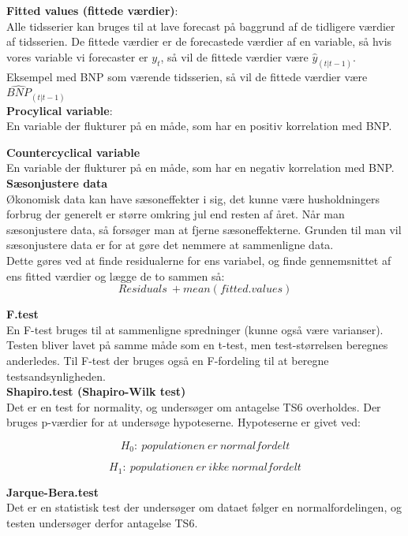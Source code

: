 \documentclass[
  10pt,
]{article}
\begin{document}
\textbf{Fitted values (fittede værdier)}:\\
Alle tidsserier kan bruges til at lave forecast på baggrund af de
tidligere værdier af tidsserien. De fittede værdier er de forecastede
værdier af en variable, så hvis vores variable vi forecaster er \(y_t\),
så vil de fittede værdier være \(\hat{{y}}_{(t|t-1)}\).\\
Eksempel med BNP som værende tidsserien, så vil de fittede værdier være
\(\hat{{BNP}}_{(t|t-1)}\)\\

\textbf{Procylical variable}:\\
En variable der flukturer på en måde, som har en positiv korrelation med
BNP.

\textbf{Countercyclical variable}\\
En variable der flukturer på en måde, som har en negativ korrelation med
BNP.\\

\textbf{Sæsonjustere data}\\
Økonomisk data kan have sæsoneffekter i sig, det kunne være
husholdningers forbrug der generelt er større omkring jul end resten af
året. Når man sæsonjustere data, så forsøger man at fjerne
sæsoneffekterne. Grunden til man vil sæsonjustere data er for at gøre
det nemmere at sammenligne data.\\
Dette gøres ved at finde residualerne for ens variabel, og finde
gennemsnittet af ens fitted værdier og lægge de to sammen så:
\[ Residuals \ + mean(fitted.values)  \]

\textbf{F.test}\\
En F-test bruges til at sammenligne spredninger (kunne også være
varianser). Testen bliver lavet på samme måde som en t-test, men
test-størrelsen beregnes anderledes. Til F-test der bruges også en
F-fordeling til at beregne testsandsynligheden.\\

\textbf{Shapiro.test (Shapiro-Wilk test)}\\
Det er en test for normality, og undersøger om antagelse TS6 overholdes.
Der bruges p-værdier for at undersøge hypoteserne. Hypoteserne er givet
ved:

\[H_0:\ populationen \ er \ normalfordelt \]

\[H_1: \ populationen\ er\ ikke\ normalfordelt \]

\textbf{Jarque-Bera.test}\\
Det er en statistisk test der undersøger om dataet følger en
normalfordelingen, og testen undersøger derfor antagelse TS6.\\
\end{document}
